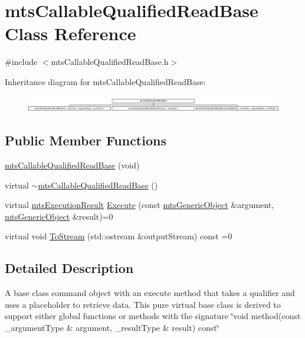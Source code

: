 \hypertarget{classmts_callable_qualified_read_base}{}\section{mts\+Callable\+Qualified\+Read\+Base Class Reference}
\label{classmts_callable_qualified_read_base}


{\ttfamily \#include $<$mts\+Callable\+Qualified\+Read\+Base.\+h$>$}

Inheritance diagram for mts\+Callable\+Qualified\+Read\+Base\+:\begin{figure}[H]
\begin{center}
\leavevmode
\includegraphics[height=0.707071cm]{d3/db4/classmts_callable_qualified_read_base}
\end{center}
\end{figure}
\subsection*{Public Member Functions}
\begin{DoxyCompactItemize}
\item 
\hyperlink{classmts_callable_qualified_read_base_aadb5cb44dcc5b7bb3ef8c3a9ff56afc3}{mts\+Callable\+Qualified\+Read\+Base} (void)
\item 
virtual \hyperlink{classmts_callable_qualified_read_base_a6f8d3595fd5fb8daa555325c79266e29}{$\sim$mts\+Callable\+Qualified\+Read\+Base} ()
\item 
virtual \hyperlink{classmts_execution_result}{mts\+Execution\+Result} \hyperlink{classmts_callable_qualified_read_base_aca2bad9e0f6976b8ca2207f67358cbf2}{Execute} (const \hyperlink{classmts_generic_object}{mts\+Generic\+Object} \&argument, \hyperlink{classmts_generic_object}{mts\+Generic\+Object} \&result)=0
\item 
virtual void \hyperlink{classmts_callable_qualified_read_base_af01602ea4eb94bf074f6e44ff3db2737}{To\+Stream} (std\+::ostream \&output\+Stream) const =0
\end{DoxyCompactItemize}


\subsection{Detailed Description}
A base class command object with an execute method that takes a qualifier and uses a placeholder to retrieve data. This pure virtual base class is derived to support either global functions or methods with the signature \char`\"{}void method(const \+\_\+argument\+Type \&
argument, \+\_\+result\+Type \& result) const\char`\"{} 

